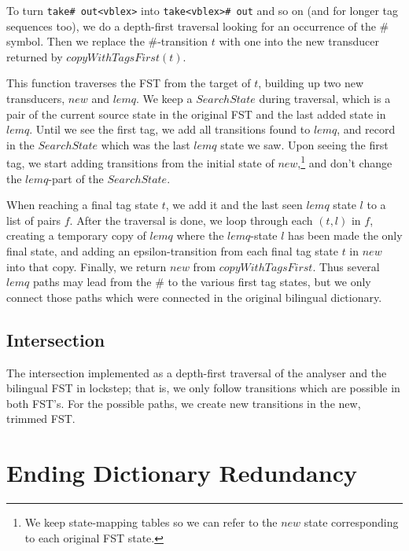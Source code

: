 \documentclass[10pt, a4paper]{article}
\newcommand{\ana}[1]{\texttt{#1}}
\begin{document}
To turn \ana{take\# out<vblex>} into \ana{take<vblex>\# out} and so on
(and for longer tag sequences too), we do a depth-first traversal looking
for an occurrence of the \# symbol. Then we replace the \#-transition
$t$ with one into the new transducer returned by
$copyWithTagsFirst(t)$. 

This function traverses the FST from the target of $t$, building up two
new transducers, $new$ and $lemq$. We keep a $SearchState$ during
traversal, which is a pair of the current source state in the original
FST and the last added state in  $lemq$. Until we see the first tag,
we add all transitions found to $lemq$, and record in the
$SearchState$
which was the last $lemq$ state we saw. Upon seeing the
first tag, we start adding transitions from the initial state of
$new$,\footnote{We keep state-mapping tables so we can refer to the
$new$ state corresponding to each original FST state.} and don't
change the $lemq$-part of the $SearchState$.

When reaching a final tag state $t$, we add it and the last seen
$lemq$ state $l$ to a list of pairs $f$. After the traversal is done,
we loop through each $(t,l)$ in $f$, creating a temporary copy of
$lemq$ where the $lemq$-state $l$ has been made the only final state,
and adding an epsilon-transition from each final tag state $t$ in
$new$ into that copy. Finally, we return $new$ from
$copyWithTagsFirst$. Thus several $lemq$ paths may lead from the \# to
the various first tag states, but we only connect those paths which
were connected in the original bilingual dictionary.

\subsection{Intersection}

The intersection implemented as a depth-first traversal of the
analyser and the bilingual FST in lockstep; that is, we only follow
transitions which are possible in both FST's. For the possible paths,
we create new transitions in the new, trimmed FST.

\section{Ending Dictionary Redundancy}
\end{document}

